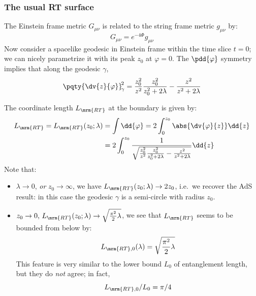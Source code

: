 \documentclass[a4paper
	,10pt
]{article}
\begin{document}
\subsubsection{The usual RT surface}
	The Einstein frame metric $G_{\mu\nu}$ is related to the string frame metric $g_{\mu\nu}$ by:
	\begin{equation}
		G_{\mu\nu} = e^{-4\Phi} g_{\mu\nu}
	\end{equation}
	Now consider a spacelike geodesic in Einstein frame within the time slice $t = 0$; we can nicely parametrize it  with its peak $z_0$ at $\varphi = 0$. The $\pdd{\varphi}$ symmetry implies that along the geodesic $\gamma$,
	\begin{equation}
		\pqty{\dv{z}{\varphi}}_{\!\gamma}^{\!2}
		= \frac{z_0^2}{z^2}
				\frac{z_0^2}{z_0^2 + 2\lambda}
			- \frac{z^2}{z^2 + 2\lambda}
	\end{equation}
	
	The coordinate length $L_\mrm{RT}$ at the boundary is given by:
	\begin{equation}
	\begin{aligned}
	  L_\mrm{RT} = L_\mrm{RT}(z_0;\lambda)
	  &= \int \dd{\varphi}
	  = 2\int_0^{z_0}
	      \abs{\dv{\varphi}{z}}
	      \dd{z} \\
	  &= 2\int_0^{z_0}
	      \frac{1}{\sqrt{
	          \frac{z_0^2}{z^2}
	          \frac{z_0^2}{z_0^2 + 2\lambda}
	          - \frac{z^2}{z^2 + 2\lambda}
	      }}
	      \dd{z}
	\end{aligned}
	\label{eq:length_function}
	\end{equation}
%	
	Note that:
	\begin{itemize}
	\item $\lambda\to 0$, \textsl{or} $z_0\to \infty$, we have $L_\mrm{RT}(z_0;\lambda) \to 2z_0$, i.e.~we recover the AdS result: in this case the geodesic $\gamma$ is a semi-circle with radius $z_0$.
	
	\item $z_0\to 0,\,
		L_\mrm{RT}(z_0;\lambda) \to \sqrt{\frac{\pi^2}{2} \lambda}
	$, we see that $L_\mrm{RT}$ seems to be bounded from below by:
	\begin{equation}
		L_{\mrm{RT},0} (\lambda)
		= \sqrt{\frac{\pi^2}{2} \lambda}
	\end{equation}
	This feature is very similar to the lower bound $L_0$ of entanglement length, but they do \textit{not} agree; in fact,
	\begin{equation}
		L_{\mrm{RT},0} / L_0 = \pi / 4
	\end{equation}
	\end{itemize}
	
\end{document}

